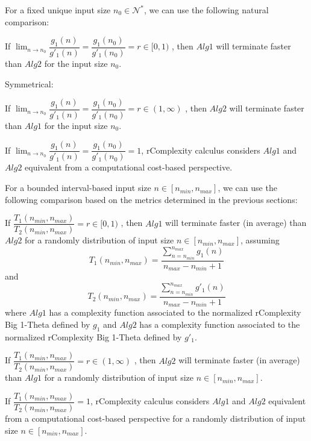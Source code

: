 For a fixed unique input size $n_{0}\in \mathcal{N}^{*}$, we can use the following natural comparison:
\begin{lemma}
If  $ \lim_{n\to n_{0}} \dfrac{g_{1}(n)}{g'_{1}(n)} = \dfrac{g_{1}(n_{0})}{g'_{1}(n_{0})} = r \in [0,1) $ , then $Alg1$ will terminate faster than $Alg2$ for the input size $n_{0}$.
\end{lemma}
Symmetrical:
\begin{lemma}
If  $ \lim_{n\to n_{0}} \dfrac{g_{1}(n)}{g'_{1}(n)} = \dfrac{g_{1}(n_{0})}{g'_{1}(n_{0})} = r \in (1,\infty) $ , then $Alg2$ will terminate faster than $Alg1$ for the input size $n_{0}$.
\end{lemma}
\begin{remark}
If  $ \lim_{n\to n_{0}} \dfrac{g_{1}(n)}{g'_{1}(n)} = \dfrac{g_{1}(n_{0})}{g'_{1}(n_{0})} = 1$, rComplexity calculus considers $Alg1$ and $Alg2$ equivalent from a computational cost-based perspective.
\end{remark}

For a bounded interval-based input size $n \in [n_{min}, n_{max}]$, we can use the following comparison based on the metrics determined in the previous sections:

\begin{theorem}
If $ \dfrac{T_{1}(n_{min}, n_{max})}{T_{2}(n_{min}, n_{max})} = r \in [0,1) $ , then $Alg1$ will terminate faster (in average) than $Alg2$ for a randomly distribution of input size $n \in [n_{min}, n_{max}]$,  assuming \[T_{1}(n_{min}, n_{max}) = \dfrac{\sum\limits_{n=n_{min}}^{n_{max}} g_{1}(n)}{n_{max} - n_{min} + 1}\] and \[T_{2}(n_{min}, n_{max}) = \dfrac{\sum\limits_{n=n_{min}}^{n_{max}} g'_{1}(n)}{n_{max} - n_{min} + 1}\] where $Alg1$ has a complexity function associated to the normalized rComplexity Big 1-Theta defined by $g_{1}$ and $Alg2$ has a complexity function associated to the normalized rComplexity Big 1-Theta defined by $g'_{1}$.
\end{theorem}

\begin{corollary}
If $ \dfrac{T_{1}(n_{min}, n_{max})}{T_{2}(n_{min}, n_{max})} = r \in (1,\infty) $ , then $Alg2$ will terminate faster (in average) than $Alg1$ for a randomly distribution of input size $n \in [n_{min}, n_{max}]$.
\end{corollary}

\begin{remark}
If  $ \dfrac{T_{1}(n_{min}, n_{max})}{T_{2}(n_{min}, n_{max})} = 1$, rComplexity calculus considers $Alg1$ and $Alg2$ equivalent from a computational cost-based perspective for a randomly distribution of input size $n \in [n_{min}, n_{max}]$.
\end{remark}

